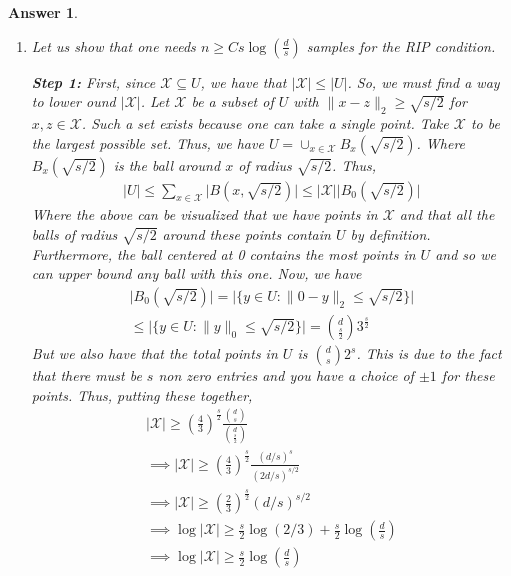 \documentclass[12pt]{article}
\theoremstyle{colon}
\newtheorem*{answer}{Answer}
\begin{document}
\begin{answer}
\begin{enumerate}[label=\arabic*)]
    \item Let us show that one needs $n \geq C s \log \left( \frac{d}{s} \right)$ samples for the RIP condition.

      \textbf{Step 1:} First, since $\mathcal{X} \subseteq U$, we have that $\lvert \mathcal{X} \rvert \leq \lvert U \rvert$. So, we must find a way to lower ound $\lvert \mathcal{X} \rvert$. Let $\mathcal{X}$ be a subset of $U$ with $\lVert x - z \rVert_2 \geq \sqrt{s/2}$ for $x,z \in \mathcal{X}$. Such a set exists because one can take a single point. Take $\mathcal{X}$ to be the largest possible set. Thus, we have $U = \cup_{x \in \mathcal{X}} B_x(\sqrt{s/2})$. Where $B_x(\sqrt{s/2})$ is the ball around $x$ of radius $\sqrt{s/2}$. Thus,
      \begin{gather*}
        \lvert U \rvert \leq \sum_{x \in \mathcal{X}} \lvert B(x, \sqrt{s/2}) \rvert \leq \lvert \mathcal{X} \rvert \lvert B_0(\sqrt{s/2}) \rvert
      \end{gather*}
      Where the above can be visualized that we have points in $\mathcal{X}$ and that all the balls of radius $\sqrt{s/2}$ around these points contain $U$ by definition. Furthermore, the ball centered at 0 contains the most points in $U$ and so we can upper bound any ball with this one. Now, we have
      \begin{gather*}
        \lvert B_0(\sqrt{s/2}) \rvert = \lvert \{ y \in U : \lVert 0 - y \rVert_2 \leq \sqrt{s/2} \} \rvert \\
        \leq \lvert \{ y \in U : \lVert y \rVert_0 \leq \sqrt{s/2} \} \rvert = \binom{d}{\frac{s}{2}} 3^{\frac{s}{2}}
      \end{gather*}
      But we also have that the total points in $U$ is $\binom{d}{s} 2^s$. This is due to the fact that there must be $s$ non zero entries and you have a choice of $\pm 1$ for these points. Thus, putting these together,
      \begin{gather*}
        \lvert \mathcal{X} \rvert \geq \left( \frac{4}{3} \right)^{\frac{s}{2}} \frac{\binom{d}{s}}{\binom{d}{\frac{s}{2}}} \\
        \implies \lvert \mathcal{X} \rvert \geq \left( \frac{4}{3} \right)^{\frac{s}{2}} \frac{(d/s)^s}{(2d/s)^{s/2}} \\
        \implies \lvert \mathcal{X} \rvert \geq \left( \frac{2}{3} \right)^{\frac{s}{2}} (d/s)^{s/2} \\
        \implies \log \lvert \mathcal{X} \rvert \geq \frac{s}{2} \log(2/3) + \frac{s}{2} \log \left( \frac{d}{s} \right) \\
        \implies \log \lvert \mathcal{X} \rvert \geq \frac{s}{2} \log \left( \frac{d}{s} \right)
      \end{gather*}


\end{enumerate}
\end{answer}
\end{document}
